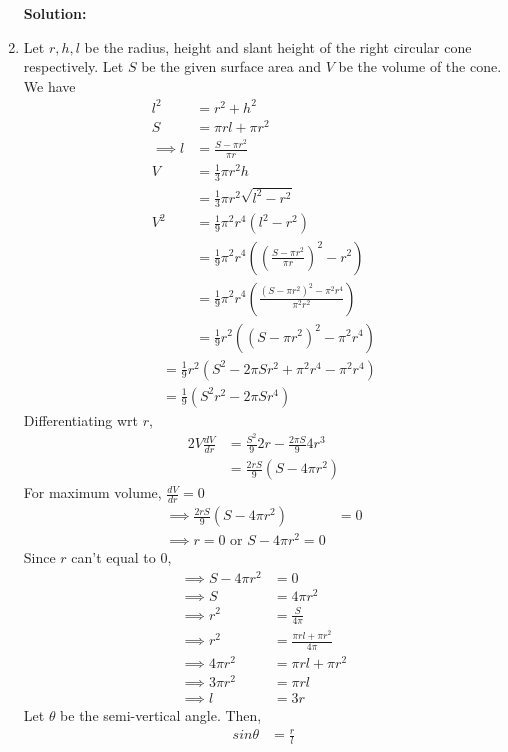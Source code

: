 \documentclass[12pt]{article}
\providecommand{\brak}[1]{\ensuremath{\left(#1\right)}}
\newcommand{\solution}{\noindent \textbf{Solution: }}
\begin{document}
\begin{enumerate}
\solution 
\item Let $r,h,l$ be the radius, height and slant height of the right circular cone respectively. Let $S$ be the given surface area and $V$ be the volume of the cone. We have 
\begin{align}
	l^2 &= r^2 + h^2 \\
	S &= \pi rl + \pi r^2 \\
	\implies l &= \frac{S-\pi r^2}{\pi r}\\
	V &= \frac{1}{3}\pi r^2h \\
	 &= \frac{1}{3}\pi r^2\sqrt{l^2-r^2} \\
	V^2 &= \frac{1}{9}\pi^2 r^4\brak{l^2-r^2} \\
	&= \frac{1}{9}\pi^2 r^4\brak{\brak{\frac{S-\pi r^2}{\pi r}}^2-r^2} \\
	&= \frac{1}{9}\pi^2 r^4\brak{\frac{\brak{S-\pi r^2}^2-\pi^2r^4 }{\pi^2 r^2}} \\
	&= \frac{1}{9} r^2\brak{\brak{S-\pi r^2}^2-\pi^2r^4 }
\end{align}
\begin{align}
	&= \frac{1}{9} r^2\brak{S^2- 2\pi S r^2 + \pi^2r^4 -\pi^2r^4 } \\
	&= \frac{1}{9} \brak{S^2r^2- 2\pi S r^4 } 
\end{align}
Differentiating wrt $r$,
\begin{align}
	2V \frac{dV}{dr} &= \frac{S^2}{9}2r - \frac{2\pi S}{9}4r^3 \\ 
	&= \frac{2rS}{9}\brak{ S- 4\pi r^2} 
\end{align}
For maximum volume, $\frac{dV}{dr} = 0$
\begin{align}
 	\implies  \frac{2rS}{9}\brak{ S- 4\pi r^2} &= 0 \\ 
	\implies r = 0 \text{ or } S - 4\pi r^2 = 0 
\end{align}
Since $r$ can't equal to 0,
\begin{align}
	\implies S - 4\pi r^2 &= 0 \\
	\implies S &= 4\pi r^2 \\
	\implies r^2 &= \frac{S}{4\pi} \\
	\implies r^2 &= \frac{\pi rl+\pi r^2}{4\pi} \\
	\implies 4\pi r^2 &= \pi rl+ \pi r^2 \\
        \implies 3\pi r^2 &= \pi rl \\
	\implies l &= 3r 
\end{align}
Let $\theta$ be the semi-vertical angle. Then,
\begin{align}
	sin\theta &= \frac{r}{l} \\

\end{align}
\end{enumerate}
\end{document}

